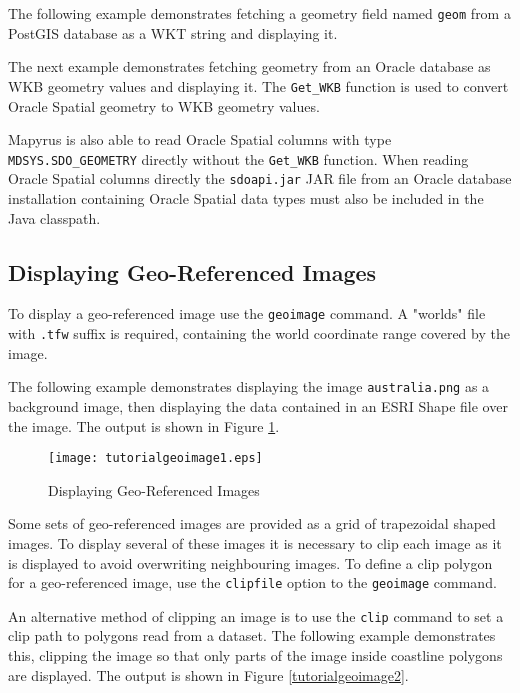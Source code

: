 The following example demonstrates fetching a geometry field named \texttt{geom}
from a PostGIS database as a WKT string and displaying it.



The next example demonstrates fetching geometry from an
Oracle database as WKB geometry values and displaying it.
The \texttt{Get\_WKB} function is used to convert Oracle
Spatial geometry to WKB geometry values.



Mapyrus is also able to read Oracle Spatial
columns with type \texttt{MDSYS.SDO\_GEOMETRY} directly
without the \texttt{Get\_WKB} function.  When reading
Oracle Spatial columns directly the
\texttt{sdoapi.jar}
JAR file from an Oracle database installation
containing Oracle Spatial data types must also be
included in the Java classpath.

\subsection{Displaying Geo-Referenced Images}

To display a geo-referenced image use the \texttt{geoimage} command.
A "worlds" file with \texttt{.tfw} suffix is required, containing
the world coordinate range covered by the image.

The following example demonstrates
displaying the image \texttt{australia.png} as a background image,
then displaying the data contained in an ESRI Shape file over the image.
The output is shown in Figure \ref{tutorialgeoimage1}.



\begin{figure}[htb]
\texttt{[image: tutorialgeoimage1.eps]}
\caption{Displaying Geo-Referenced Images}
\label{tutorialgeoimage1}
\end{figure}

Some sets of geo-referenced images are provided as a grid
of trapezoidal shaped images.
To display several of these images it is necessary to clip
each image as it is displayed to avoid overwriting neighbouring
images.  To define a clip polygon for a geo-referenced image, use
the \texttt{clipfile} option to the \texttt{geoimage} command.

An alternative method of clipping an image is to use the
\texttt{clip} command to set a clip path to polygons read from a dataset.
The following example demonstrates this, clipping the image so
that only parts of the image inside coastline polygons are displayed.
The output is shown in Figure \ref{tutorialgeoimage2}.

